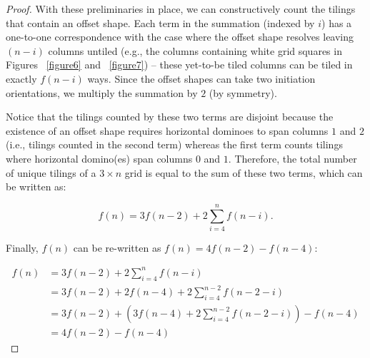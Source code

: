 \documentclass{article}
\begin{document}
\begin{proof}
    With these preliminaries in place, we can constructively count the tilings that contain an offset shape. Each term in the summation (indexed by $i$) has a one-to-one correspondence with the case where the offset shape resolves leaving $(n - i)$ columns untiled (e.g., the columns containing white grid squares in Figures ~\ref{figure6} and ~\ref{figure7}) -- these yet-to-be tiled columns can be tiled in exactly $f(n - i)$ ways. Since the offset shapes can take two initiation orientations, we multiply the summation by $2$ (by symmetry).

    Notice that the tilings counted by these two terms are disjoint because the existence of an offset shape requires horizontal dominoes to span columns $1$ and $2$ (i.e., tilings counted in the second term) whereas the first term counts tilings where horizontal domino(es) span columns \(0\) and \(1\). Therefore, the total number of unique tilings of a \(3 \times n\) grid is equal to the sum of these two terms, which can be written as:
    
    \[f(n) = 3f(n-2) + 2\sum_{i = 4}^{n}f(n-i) \text{.}\]

    Finally, \(f(n)\) can be re-written as \(f(n) = 4f(n-2) - f(n-4)\):

    \begin{align*}
        f(n) &= 3f(n-2) + 2\sum_{i = 4}^{n}f(n-i)\\
        &= 3f(n-2) + 2f(n - 4) + 2\sum_{i = 4}^{n-2}f(n-2-i)\\
        &= 3f(n-2) + \left(3f(n - 4) + 2\sum_{i = 4}^{n-2}f(n-2-i)\right) - f(n - 4)\\
        &= 4f(n-2) - f(n-4)    
    \end{align*}


\end{proof}
\end{document}
